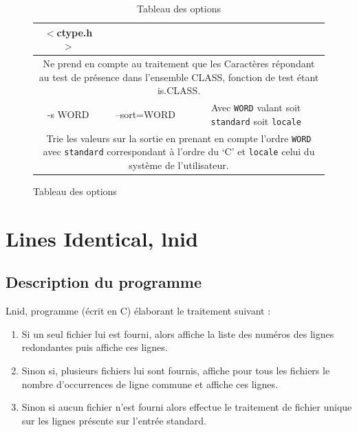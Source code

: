 \documentclass[12pt]{article}
\begin{document}
\begin{table}[H]
\begin{figure}[H]
\begin{tabular}{|c|c|c|}
{{                    $<$ctype.h$>$}} \\ [1.3em]
                \hline
                    \multicolumn{3}{|c|}{\cellcolor{blue-u!7}\rule{0pt}{2em}
                    \parbox{15cm}{Ne prend en compte au traitement que les 
                    Caractères répondant au test  de présence dans l'ensemble 
                    CLASS, fonction de test étant is.CLASS.}}\\[.8em]
                \hline
                    \cellcolor{blue-s!25} -s WORD & \cellcolor{blue-s!25} 
                    --sort=WORD & \cellcolor{blue-t!70}Avec \texttt{WORD} valant
                    soit \texttt{standard} soit \texttt{locale} \\
                \hline
                    \multicolumn{3}{|c|}{\cellcolor{blue-u!7}\rule{0pt}{2em}
                    \parbox{15cm}{{Trie les valeurs sur la sortie en prenant en 
                    compte l'ordre \texttt{WORD} avec \texttt{standard}} 
                    correspondant à l'ordre du  `C' et \texttt{locale} celui du 
                    système de l'utilisateur.}}\\[1em]
                \hline
            \end{tabular}
            \captionsetup{position=bottom}
            \caption{Tableau des options}\label{table-opt}
        \end{figure}
    \end{table}

    \newpage

    \section{Lines Identical, lnid}

    \subsection{Description du programme}

    Lnid, programme (écrit en C) élaborant le traitement suivant :
    \begin{enumerate}
        \item[] Si un seul fichier lui est fourni, alors affiche la liste 
        des numéros des lignes redondantes puis affiche ces lignes.
        \item[] Sinon si, plusieurs fichiers lui sont fournis, affiche pour
         tous les fichiers le nombre d'occurrences de ligne commune et 
         affiche ces lignes.
        \item[] Sinon si aucun fichier n'est fourni alors effectue le 
        traitement de fichier unique sur les lignes présente sur l'entrée 
        standard.
    \end{enumerate}
\end{document}
